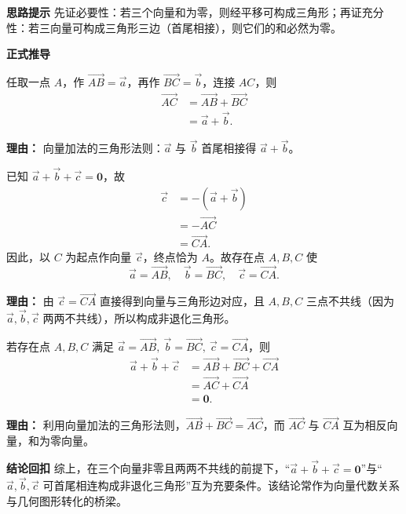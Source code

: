 \begin{proofbox}
	\textbf{\textcolor{CProof}{思路提示}}
	先证必要性：若三个向量和为零，则经平移可构成三角形；再证充分性：若三向量可构成三角形三边（首尾相接），则它们的和必然为零。

	\medskip
	\textbf{\textcolor{CProof}{正式推导}}
	\begin{description}[style=nextline, leftmargin=2.8em, labelsep=0.5em, itemsep=0.55em]
		\item[\textbf{步骤一（作两向量首尾接）：}]
		      任取一点 $A$，作 $\overrightarrow{AB} = \vec{a}$，再作 $\overrightarrow{BC} = \vec{b}$，连接 $AC$，则
		      \[
			      \begin{aligned}
				      \overrightarrow{AC}
				       & = \overrightarrow{AB} + \overrightarrow{BC} \\
				       & = \vec{a} + \vec{b}.
			      \end{aligned}
		      \]
		      \par\textbf{理由：} 向量加法的三角形法则：$\vec{a}$ 与 $\vec{b}$ 首尾相接得 $\vec{a}+\vec{b}$。
		\item[\textbf{步骤二（由和为零确定第三边）：}]
		      已知 $\vec{a}+\vec{b}+\vec{c} = \mathbf{0}$，故
		      \[
			      \begin{aligned}
				      \vec{c}
				       & = -(\vec{a}+\vec{b})   \\
				       & = -\overrightarrow{AC} \\
				       & = \overrightarrow{CA}.
			      \end{aligned}
		      \]
		      因此，以 $C$ 为起点作向量 $\vec{c}$，终点恰为 $A$。故存在点 $A,B,C$ 使
		      \[
			      \vec{a} = \overrightarrow{AB},\quad
			      \vec{b} = \overrightarrow{BC},\quad
			      \vec{c} = \overrightarrow{CA}.
		      \]
		      \par\textbf{理由：} 由 $\vec{c} = \overrightarrow{CA}$ 直接得到向量与三角形边对应，且 $A,B,C$ 三点不共线（因为 $\vec{a},\vec{b},\vec{c}$ 两两不共线），所以构成非退化三角形。
		\item[\textbf{步骤三（充分性直接验证）：}]
		      若存在点 $A,B,C$ 满足 $\vec{a}=\overrightarrow{AB},\ \vec{b}=\overrightarrow{BC},\ \vec{c}=\overrightarrow{CA}$，则
		      \[
			      \begin{aligned}
				      \vec{a}+\vec{b}+\vec{c}
				       & = \overrightarrow{AB} + \overrightarrow{BC} + \overrightarrow{CA} \\
				       & = \overrightarrow{AC} + \overrightarrow{CA}                       \\
				       & = \mathbf{0}.
			      \end{aligned}
		      \]
		      \par\textbf{理由：} 利用向量加法的三角形法则，$\overrightarrow{AB}+\overrightarrow{BC}=\overrightarrow{AC}$，而 $\overrightarrow{AC}$ 与 $\overrightarrow{CA}$ 互为相反向量，和为零向量。
	\end{description}

	\medskip
	\textbf{\textcolor{CProof}{结论回扣}}
	综上，在三个向量非零且两两不共线的前提下，“$\vec{a}+\vec{b}+\vec{c} = \mathbf{0}$”与“$\vec{a},\vec{b},\vec{c}$ 可首尾相连构成非退化三角形”互为充要条件。该结论常作为向量代数关系与几何图形转化的桥梁。
\end{proofbox}